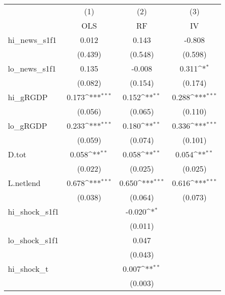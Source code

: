 {
\def\sym#1{\ifmmode^{#1}\else\(^{#1}\)\fi}
\begin{tabular}{l*{3}{c}}
\toprule
            &\multicolumn{1}{c}{(1)}&\multicolumn{1}{c}{(2)}&\multicolumn{1}{c}{(3)}\\
            &\multicolumn{1}{c}{OLS}&\multicolumn{1}{c}{RF}&\multicolumn{1}{c}{IV}\\
\midrule
hi\_news\_s1f1&       0.012         &       0.143         &      -0.808         \\
            &     (0.439)         &     (0.548)         &     (0.598)         \\
\addlinespace
lo\_news\_s1f1&       0.135         &      -0.008         &       0.311\sym{*}  \\
            &     (0.082)         &     (0.154)         &     (0.174)         \\
\addlinespace
hi\_gRGDP    &       0.173\sym{***}&       0.152\sym{**} &       0.288\sym{***}\\
            &     (0.056)         &     (0.065)         &     (0.110)         \\
\addlinespace
lo\_gRGDP    &       0.233\sym{***}&       0.180\sym{**} &       0.336\sym{***}\\
            &     (0.059)         &     (0.074)         &     (0.101)         \\
\addlinespace
D.tot       &       0.058\sym{**} &       0.058\sym{**} &       0.054\sym{**} \\
            &     (0.022)         &     (0.025)         &     (0.025)         \\
\addlinespace
L.netlend   &       0.678\sym{***}&       0.650\sym{***}&       0.616\sym{***}\\
            &     (0.038)         &     (0.064)         &     (0.073)         \\
\addlinespace
hi\_shock\_s1f1&                     &      -0.020\sym{*}  &                     \\
            &                     &     (0.011)         &                     \\
\addlinespace
lo\_shock\_s1f1&                     &       0.047         &                     \\
            &                     &     (0.043)         &                     \\
\addlinespace
hi\_shock\_t  &                     &       0.007\sym{**} &                     \\
            &                     &     (0.003)         &                     \\

\end{tabular}}
